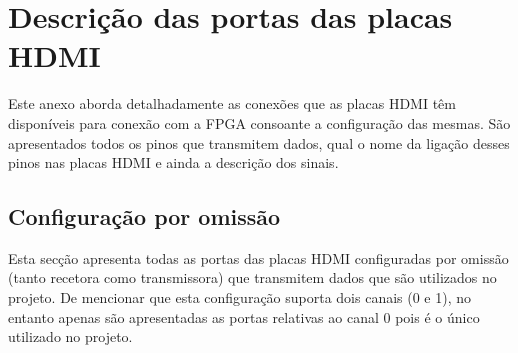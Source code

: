 \chapter{Descrição das portas das placas HDMI} \label{ap1:HDMI}

Este anexo aborda detalhadamente as conexões que as placas HDMI têm disponíveis para conexão com a FPGA consoante a configuração das mesmas. São apresentados todos os pinos que transmitem dados, qual o nome da ligação desses pinos nas placas HDMI e ainda a descrição dos sinais.
\section{Configuração por omissão} \label{ap1:default}

Esta secção apresenta todas as portas das placas HDMI configuradas por omissão (tanto recetora como transmissora) que transmitem dados que são utilizados no projeto. De mencionar que esta configuração suporta dois canais (0 e 1), no entanto apenas são apresentadas as portas relativas ao canal 0 pois é o único utilizado no projeto.


